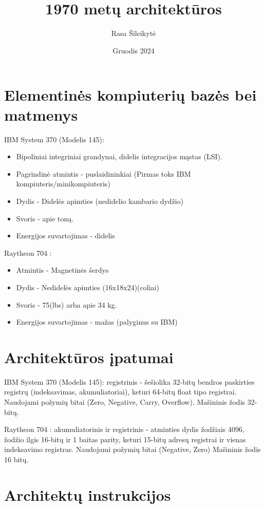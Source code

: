 \documentclass{article}
\title{\bold{IBM System 370 vs. Raytheon 704} \\1970 metų architektūros}
\author{Rasa Šileikytė}
\date{Gruodis 2024}
\begin{document}
\maketitle
\section*{Elementinės kompiuterių bazės bei matmenys}
\begin{multicols}{2}
IBM System 370 (Modelis 145):
\begin{itemize}
\item Bipoliniai integriniai grandynai, didelis integracijos mąstas (LSI).
\item Pagrindinė atmintis - puslaidininkiai (Pirmas toks IBM kompiuteris/minikompiuteris)
\item Dydis - Didelės apimties (nedidelio kambario dydžio)
\item Svoris - apie toną.
\item Energijos suvartojimas - didelis
\end{itemize}

\columnbreak

Raytheon 704 :
\begin{itemize}
\item Atmintis - Magnetinės šerdys
\item Dydis - Nedidelės apimties (16x18x24)(coliai)
\item Svoris - 75(lbs) arba apie 34 kg.
\item Energijos suvartojimas - mažas (palyginus su IBM)
\end{itemize}
\end{multicols}
\section*{Architektūros įpatumai}
\begin{multicols}{2}
IBM System 370 (Modelis 145): registrinis - šešiolika 32-bitų bendros paskirties registrų (indeksavimas, akumuliatoriai), keturi 64-bitų float tipo registrai. Naudojami požymių bitai (Zero, Negative, Carry, Overflow). Mašininis žodis 32-bitų.

\columnbreak
Raytheon 704 : akumuliatorinis ir registrinis - atminties dydis žodžiais 4096, žodžio ilgis 16-bitų ir 1 baitas parity, keturi 15-bitų adresų registrai ir vienas indeksavimo registras. Naudojami požymių bitai (Negative, Zero) Mašininis žodis 16 bitų.
\end{multicols}

\section*{Architektų instrukcijos}
\end{document}
